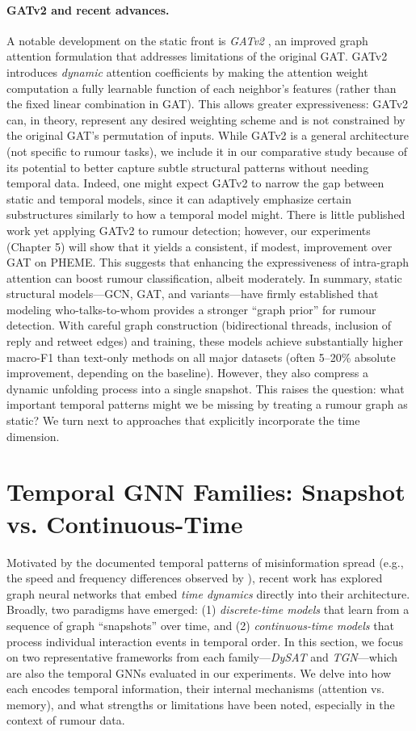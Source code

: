 \documentclass{cshonours}
\begin{document}
\paragraph{GATv2 and recent advances.} A notable development on the static front is \emph{GATv2} \cite{brody2022gatv2}, an improved graph attention formulation that addresses limitations of the original GAT. GATv2 introduces \emph{dynamic} attention coefficients by making the attention weight computation a fully learnable function of each neighbor’s features (rather than the fixed linear combination in GAT). This allows greater expressiveness: GATv2 can, in theory, represent any desired weighting scheme and is not constrained by the original GAT’s permutation of inputs. While GATv2 is a general architecture (not specific to rumour tasks), we include it in our comparative study because of its potential to better capture subtle structural patterns without needing temporal data. Indeed, one might expect GATv2 to narrow the gap between static and temporal models, since it can adaptively emphasize certain substructures similarly to how a temporal model might. There is little published work yet applying GATv2 to rumour detection; however, our experiments (Chapter 5) will show that it yields a consistent, if modest, improvement over GAT on PHEME. This suggests that enhancing the expressiveness of intra-graph attention can boost rumour classification, albeit moderately. In summary, static structural models—GCN, GAT, and variants—have firmly established that modeling who-talks-to-whom provides a stronger “graph prior” for rumour detection. With careful graph construction (bidirectional threads, inclusion of reply and retweet edges) and training, these models achieve substantially higher macro-F1 than text-only methods on all major datasets (often 5–20\% absolute improvement, depending on the baseline). However, they also compress a dynamic unfolding process into a single snapshot. This raises the question: what important temporal patterns might we be missing by treating a rumour graph as static? We turn next to approaches that explicitly incorporate the time dimension.

\section{Temporal GNN Families: Snapshot vs. Continuous-Time}
Motivated by the documented temporal patterns of misinformation spread (e.g., the speed and frequency differences observed by \cite{vosoughi2018spread}), recent work has explored graph neural networks that embed \emph{time dynamics} directly into their architecture. Broadly, two paradigms have emerged: (1) \emph{discrete-time models} that learn from a sequence of graph “snapshots” over time, and (2) \emph{continuous-time models} that process individual interaction events in temporal order. In this section, we focus on two representative frameworks from each family—\emph{DySAT} and \emph{TGN}—which are also the temporal GNNs evaluated in our experiments. We delve into how each encodes temporal information, their internal mechanisms (attention vs. memory), and what strengths or limitations have been noted, especially in the context of rumour data.
\end{document}

